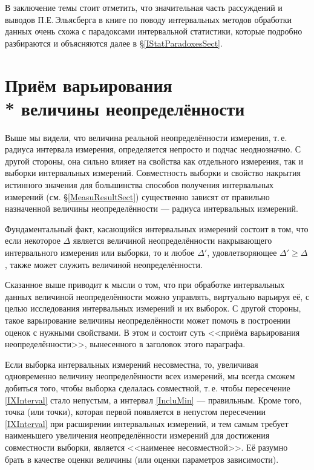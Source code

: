 \documentclass[a5paper,openany]{book}
\begin{document}
В заключение темы стоит отметить, что значительная часть рассуждений и выводов 
П.Е.\,Эльясберга в книге \cite{Eliasberg83} по поводу интервальных методов обработки 
данных очень схожа с парадоксами интервальной статистики, которые подробно разбираются 
и объясняются далее в \S\ref{IStatParadoxesSect}. 
  
  
\section[Приём варьирования величины неопределённости]%
        {Приём варьирования \\*  величины неопределённости} 
\label{UncertAlterSect} 

Выше мы видели, что величина реальной неопределённости измерения, т.\,е. радиуса 
интервала измерения, определяется непросто и подчас неоднозначно. С другой стороны, 
она сильно влияет на свойства как отдельного измерения, так и выборки интервальных 
измерений. Совместность выборки и свойство накрытия истинного значения для большинства 
способов получения интервальных измерений (см. \S\ref{MeasuResultSect}) существенно 
зависят от правильно назначенной величины неопределённости --- радиуса интервальных 
измерений. 
  
Фундаментальный факт, касающийся интервальных измерений состоит в том, что если 
некоторое $\Delta$ является величиной неопределённости накрывающего интервального 
измерения или выборки, то и любое $\Delta'$, удовлетворяющее $\Delta' \geq\Delta$, 
также может служить величиной неопределённости.  
   
Сказанное выше приводит к мысли о том, что при обработке интервальных данных величиной 
неопределённости можно управлять, виртуально варьируя её, с целью исследования 
интервальных измерений и их выборок. С другой стороны, такое варьирование величины 
неопределённости может помочь в построении оценок с нужными свойствами. В этом 
и состоит суть <<приёма варьирования неопределённости>>, вынесенного в заголовок 
этого параграфа.        
  
Если выборка интервальных измерений несовместна, то, увеличивая одновременно величину 
неопределённости всех измерений, мы всегда сможем добиться того, чтобы выборка 
сделалась совместной, т.\,е. чтобы пересечение \eqref{IXInterval} стало непустым, 
а интервал \eqref{IncluMin} --- правильным. Кроме того, точка (или точки), которая 
первой появляется в непустом пересечении \eqref{IXInterval} при расширении интервальных 
измерений, и тем самым требует наименьшего увеличения неопределённости измерений 
для достижения  совместности выборки, является <<наименее несовместной>>. 
Её разумно брать в качестве оценки величины (или оценки параметров зависимости). 
  
\end{document}
